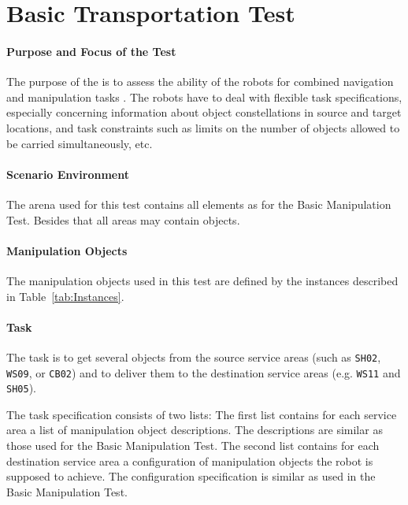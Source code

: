 \newpage
\section{Basic Transportation Test}

\paragraph{Purpose and Focus of the Test}
The purpose of the  is to assess the ability of the robots for combined navigation and manipulation tasks . 
The robots have to deal with flexible task specifications, especially concerning information about object constellations in source and target locations, and task constraints such as limits on the number of objects allowed to be carried simultaneously, etc.

\paragraph{Scenario Environment}
The arena used for this test contains all elements as for the Basic Manipulation Test. Besides that all areas may contain objects.

\paragraph{Manipulation Objects}
The manipulation objects used in this test are defined by the instances described in Table~\ref{tab:Instances}.

\paragraph{Task}
 The task is to get several objects from the source service areas (such as \texttt{SH02}, \texttt{WS09}, or \texttt{CB02}) and to deliver them to the destination service areas (e.g. \texttt{WS11} and \texttt{SH05}).  
\par
The task specification consists of two lists:
The first list contains for each service area a list of manipulation object descriptions. The descriptions are similar as those used for the Basic Manipulation Test. 
The second list contains for each destination service area a configuration of manipulation objects the robot is supposed to achieve. The configuration specification is similar as used in the Basic Manipulation Test. 

